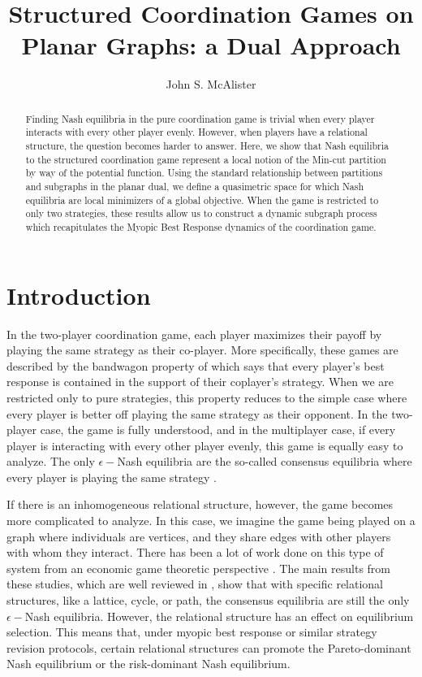 \documentclass{article}
\title{Structured Coordination Games on Planar Graphs: a Dual Approach}
\author[1,2]{John S. McAlister}
\affil[1]{Princeton University, Program in Applied and Computational Mathematics}
\affil[2]{NSF Center for Analysis and Prediction of Pandemic Expansion (APPEX)}
\date{}
\begin{document}
\maketitle

\begin{abstract}
Finding Nash equilibria in the pure coordination game is trivial when every player interacts with every other player evenly. However, when players have a relational structure, the question becomes harder to answer. Here, we show that Nash equilibria to the structured coordination game represent a local notion of the Min-cut partition by way of the potential function. Using the standard relationship between partitions and subgraphs in the planar dual, we define a quasimetric space for which Nash equilibria are local minimizers of a global objective. When the game is restricted to only two strategies, these results allow us to construct a dynamic subgraph process which recapitulates the Myopic Best Response dynamics of the coordination game.    
\end{abstract}

\section{Introduction}
In the two-player coordination game, each player maximizes their payoff by playing the same strategy as their co-player. More specifically, these games are described by the bandwagon property of \cite{Kandori1998} which says that every player's best response is contained in the support of their coplayer's strategy. When we are restricted only to pure strategies, this property reduces to the simple case where every player is better off playing the same strategy as their opponent. In the two-player case, the game is fully understood, and in the multiplayer case, if every player is interacting with every other player evenly, this game is equally easy to analyze. The only $\epsilon-$Nash equilibria are the so-called consensus equilibria where every player is playing the same strategy \citep{Kandori1993,Kandori1995}. 

If there is an inhomogeneous relational structure, however, the game becomes more complicated to analyze. In this case, we imagine the game being played on a graph where individuals are vertices, and they share edges with other players with whom they interact. There has been a lot of work done on this type of system from an economic game theoretic perspective \citep{Ellison1993,Ellison2000,Gilboa1991,Ely2002,Oechssler1997,Oechssler1999,Robson1995}. The main results from these studies, which are well reviewed in \cite{Weidenholzer}, show that with specific relational structures, like a lattice, cycle, or path, the consensus equilibria are still the only $\epsilon-$Nash equilibria. However, the relational structure has an effect on equilibrium selection. This means that, under myopic best response or similar strategy revision protocols, certain relational structures can promote the Pareto-dominant Nash equilibrium or the risk-dominant Nash equilibrium. 
\end{document}
